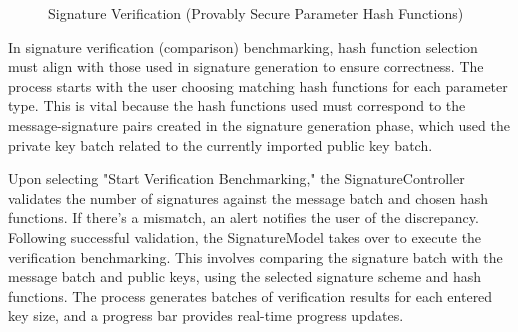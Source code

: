 \documentclass[]{final_report}
\theoremstyle{definition}
\begin{document}
\begin{figure}[H]
\begin{minipage}{0.49\textwidth}
        \caption{Signature Verification (Provably Secure Parameter Hash Functions)}
        \label{fig:image2}
    \end{minipage}
\end{figure}


In signature verification (comparison) benchmarking, hash function selection must align with those used in signature generation to ensure correctness. The process starts with the user choosing matching hash functions for each parameter type. This is vital because the hash functions used must correspond to the message-signature pairs created in the signature generation phase, which used the private key batch related to the currently imported public key batch.

Upon selecting "Start Verification Benchmarking," the SignatureController validates the number of signatures against the message batch and chosen hash functions. If there's a mismatch, an alert notifies the user of the discrepancy. Following successful validation, the SignatureModel takes over to execute the verification benchmarking. This involves comparing the signature batch with the message batch and public keys, using the selected signature scheme and hash functions. The process generates batches of verification results for each entered key size, and a progress bar provides real-time progress updates.
\end{document}
